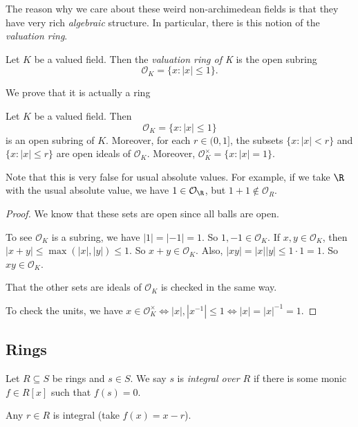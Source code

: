 \documentclass[a4paper]{article}
\begin{document}
The reason why we care about these weird non-archimedean fields is that they have very rich \emph{algebraic} structure. In particular, there is this notion of the \emph{valuation ring}.

\begin{defi}
   Let $K$ be a valued field. Then the \emph{valuation ring of K} is the open subring
  \[
    \mathcal{O}_K = \{x: |x| \leq 1\}.
  \]
\end{defi}

We prove that it is actually a ring
\begin{prop}
  Let $K$ be a valued field. Then
  \[
    \mathcal{O}_K = \{x: |x| \leq 1\}
  \]
  is an open subring of $K$. Moreover, for each $r \in (0, 1]$, the subsets $\{x : |x| < r\}$ and $\{x: |x| \leq r\}$ are open ideals of $\mathcal{O}_K$. Moreover, $\mathcal{O}_K^\times = \{x : |x| = 1\}$.
\end{prop}
Note that this is very false for usual absolute values. For example, if we take $\R$ with the usual absolute value, we have $1 \in \mathcal{O}_\R$, but $1+ 1 \not\in \mathcal{O}_R$.

\begin{proof}
  We know that these sets are open since all balls are open.

  To see $\mathcal{O}_K$ is a subring, we have $|1| = |-1| = 1$. So $1, -1 \in \mathcal{O}_K$. If $x, y \in \mathcal{O}_K$, then $|x + y| \leq \max(|x|, |y|) \leq 1$. So $x + y \in \mathcal{O}_K$. Also, $|xy| = |x||y| \leq 1 \cdot 1 = 1$. So $xy \in \mathcal{O}_K$.

  That the other sets are ideals of $\mathcal{O}_K$ is checked in the same way.

  To check the units, we have $x \in \mathcal{O}_K^\times \Leftrightarrow |x|, |x^{-1}| \leq 1 \Leftrightarrow |x| = |x|^{-1} = 1$.
\end{proof}

\subsection{Rings}

\begin{defi}
  Let $R \subseteq S$ be rings and $s \in S$. We say $s$ is \emph{integral over $R$} if there is some monic $f \in R[x]$ such that $f(s) = 0$.
\end{defi}

\begin{eg}
  Any $r \in R$ is integral (take $f(x) = x - r$).
\end{eg}
\end{document}
